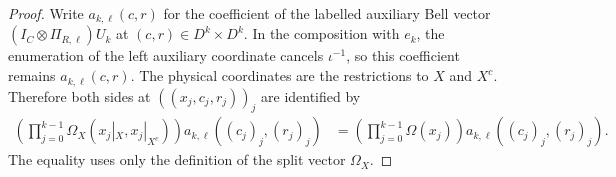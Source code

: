 \begin{proof}
    \leanok
    Write $a_{k,\ell}(c,r)$ for the coefficient of the labelled auxiliary
    Bell vector $(I_C\otimes\Pi_{R,\ell})U_k$ at $(c,r)\in D^k\times D^k$.
    In the composition with $e_k$, the enumeration of the left auxiliary
    coordinate cancels $\iota^{-1}$, so this coefficient remains
    $a_{k,\ell}(c,r)$. The physical coordinates are the restrictions to
    $X$ and $X^c$. Therefore both sides at $((x_j,c_j,r_j))_j$ are identified by
    \begin{align*}
        \left(\prod_{j=0}^{k-1}\Omega_X(x_j|_X,x_j|_{X^c})\right)
        a_{k,\ell}((c_j)_j,(r_j)_j)
        &=\left(\prod_{j=0}^{k-1}\Omega(x_j)\right)
        a_{k,\ell}((c_j)_j,(r_j)_j).
    \end{align*}
    The equality uses only the definition of the split vector $\Omega_X$.
\end{proof}
